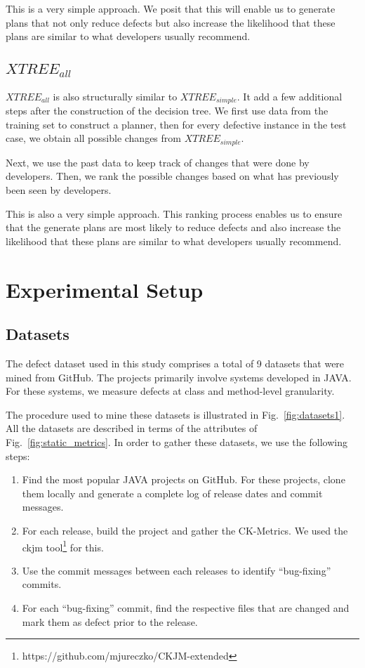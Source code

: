 \documentclass[sigconf, proceedings, 9pt]{acmart}
\newcommand{\be}{\begin{enumerate}}
\newcommand{\ee}{\end{enumerate}}
\newcommand{\fig}[1]{Fig.~\ref{fig:#1}}
\begin{document}
This is a very simple approach. We posit that this will enable us to generate 
plans that not only reduce defects but also increase the likelihood that these 
plans are similar to what developers usually recommend.

\subsection{$XTREE_{all}$}
$XTREE_{all}$ is also structurally similar to $XTREE_{simple}$. It add a few 
additional steps after the construction of the decision tree. We first use data 
from the training set to construct a planner, then for every defective instance 
in the test case, we obtain all possible changes from $XTREE_{simple}$.

Next, we use the past data to keep track of changes that were done by 
developers. Then, we rank the possible changes based on what has previously 
been seen by developers. 

This is also a very simple approach. This ranking process enables us to ensure 
that the generate plans are most likely to reduce defects and also increase the 
likelihood that these plans are similar to what developers usually recommend.

\section{Experimental Setup}
\label{sect:expt}

\subsection{Datasets} 
\label{sect:datasets}




The defect dataset used in this study comprises a total of 9 datasets that were 
mined from GitHub. The projects primarily involve systems developed in JAVA. 
For these systems, we measure defects at class and method-level granularity. 

The procedure used to mine these datasets is illustrated in 
\fig{datasets1}. All the datasets are 
described in terms of the attributes of \fig{static_metrics}. In order to 
gather these datasets, we use the following steps:
\be
\item Find the most popular JAVA projects on GitHub. For these projects, clone 
them locally and generate a complete log of release dates and commit messages.
\item For each release, build the project and gather the CK-Metrics. We used 
the ckjm tool\footnote{https://github.com/mjureczko/CKJM-extended} for this.
\item Use the commit messages between each releases to identify ``bug-fixing'' 
commits.
\item For each ``bug-fixing'' commit, find the respective files that are 
changed and mark them as defect prior to the release.
\ee
\end{document}
